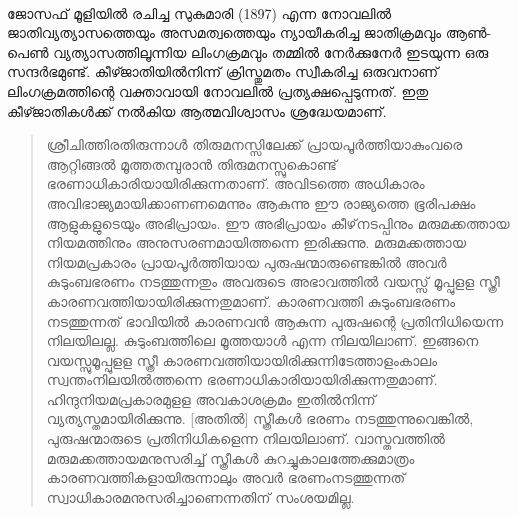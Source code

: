 \paragraph{}ജോസഫ് മൂളിയിൽ രചിച്ച സുകുമാരി (1897) എന്ന നോവലിൽ ജാതിവ്യത്യാസത്തെയും അസമത്വത്തെയും ന്യായീകരിച്ച ജാതിക്രമവും ആൺ-പെൺ വ്യത്യാസത്തിലൂന്നിയ ലിംഗക്രമവും തമ്മിൽ നേർക്കുനേർ ഇടയുന്ന ഒരു സന്ദർഭമുണ്ട്. കീഴ്ജാതിയിൽനിന്ന് ക്രിസ്തുമതം സ്വീകരിച്ച ഒരുവനാണ് ലിംഗക്രമത്തിന്റെ വക്താവായി നോവലിൽ പ്രത്യക്ഷപ്പെടുന്നത്. ഇതു കീഴ്ജാതികൾക്ക് നൽകിയ ആത്മവിശ്വാസം ശ്രദ്ധേയമാണ്.

\begin{quotation}
\noindent ശ്രീചിത്തിരതിരുന്നാൾ തിരുമനസ്സിലേക്ക് പ്രായപൂർത്തിയാകുംവരെ ആറ്റിങ്ങൽ മൂത്തതമ്പുരാൻ തിരുമനസ്സുകൊണ്ട് ഭരണാധികാരിയായിരിക്കുന്നതാണ്. അവിടത്തെ അധികാരം അവിഭാജ്യമായിക്കാണണമെന്നും ആകുന്നു ഈ രാജ്യത്തെ ഭൂരിപക്ഷം ആളുകളുടെയും അഭിപ്രായം. ഈ അഭിപ്രായം കീഴ്‌നടപ്പിനും മരുമക്കത്തായ നിയമത്തിനും അനുസരണമായിത്തന്നെ ഇരിക്കുന്നു. മരുമക്കത്തായ നിയമപ്രകാരം പ്രായപൂർത്തിയായ പുരുഷന്മാരുണ്ടെങ്കിൽ അവർ കുടുംബഭരണം നടത്തുന്നതും അവരുടെ അഭാവത്തിൽ വയസ്സ് മൂപ്പുളള സ്ത്രീ കാരണവത്തിയായിരിക്കുന്നതുമാണ്. കാരണവത്തി കുടുംബഭരണം നടത്തുന്നത് ഭാവിയിൽ കാരണവൻ ആകുന്ന പുരുഷന്റെ പ്രതിനിധിയെന്ന നിലയിലല്ല. കുടുംബത്തിലെ മൂത്തയാൾ എന്ന നിലയിലാണ്. ഇങ്ങനെ വയസ്സുമൂപ്പുളള സ്ത്രീ കാരണവത്തിയായിരിക്കുന്നിടേത്താളംകാലം സ്വന്തംനിലയിൽത്തന്നെ ഭരണാധികാരിയായിരിക്കുന്നതുമാണ്. ഹിന്ദുനിയമപ്രകാരമുളള അവകാശക്രമം ഇതിൽനിന്ന് വ്യത്യസ്തമായിരിക്കുന്നു. [അതിൽ] സ്ത്രീകൾ ഭരണം നടത്തുന്നുവെങ്കിൽ, പുരുഷന്മാരുടെ പ്രതിനിധികളെന്ന നിലയിലാണ്. വാസ്തവത്തിൽ മരുമക്കത്തായമനുസരിച്ച് സ്ത്രീകൾ കുറച്ചുകാലത്തേക്കുമാത്രം കാരണവത്തികളായിരുന്നാലും അവർ ഭരണംനടത്തുന്നത് സ്വാധികാരമനുസരിച്ചാണെന്നതിന് സംശയമില്ല.
\end{quotation}

